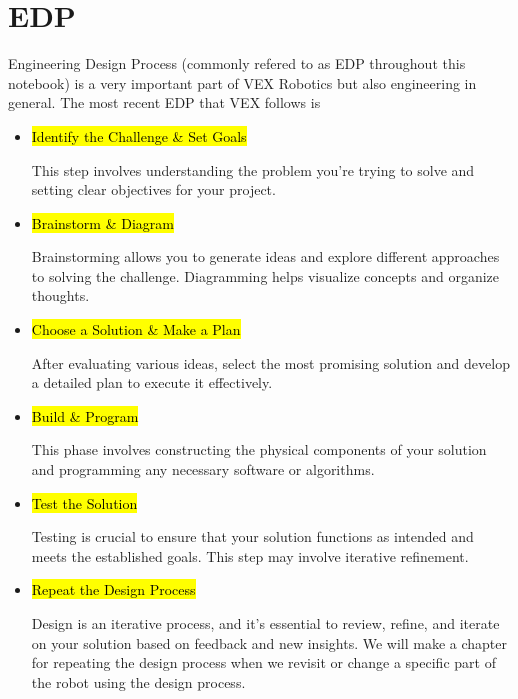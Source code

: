 \section*{EDP}
Engineering Design Process (commonly refered to as EDP throughout this notebook) is a very important part of VEX Robotics but also engineering in general. The most recent EDP that VEX follows is 


\begin{itemize}

    \item {}\hl{Identify the Challenge \& Set Goals}
    
    This step involves understanding the problem you're trying to solve and setting clear objectives for your project.
    
    \item {}\hl{Brainstorm \& Diagram}
    
    Brainstorming allows you to generate ideas and explore different approaches to solving the challenge. Diagramming helps visualize concepts and organize thoughts.
    
    \item {}\hl{Choose a Solution \& Make a Plan}
    
    After evaluating various ideas, select the most promising solution and develop a detailed plan to execute it effectively.
    
    \item {}\hl{Build \& Program}
    
    This phase involves constructing the physical components of your solution and programming any necessary software or algorithms.
    
    \item {}\hl{Test the Solution}
    
    Testing is crucial to ensure that your solution functions as intended and meets the established goals. This step may involve iterative refinement.
    
    \item {}\hl{Repeat the Design Process}
    
    Design is an iterative process, and it's essential to review, refine, and iterate on your solution based on feedback and new insights. We will make a chapter for repeating the design process when we revisit or change a specific part of the robot using the design process. 
    
\end{itemize}
